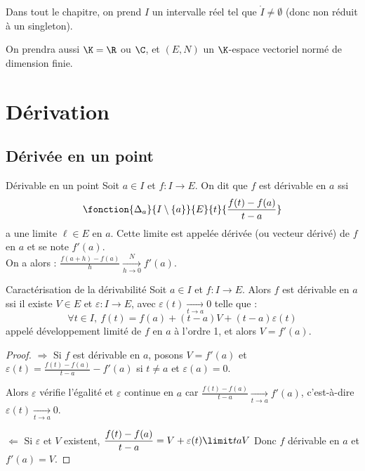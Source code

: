 Dans tout le chapitre, on prend $I$ un intervalle réel tel que $\mathring{I} \neq \emptyset$ (donc non réduit à un singleton).

On prendra aussi $\K = \R$ ou $\C$, et $(E,N)$ un $\K$-espace vectoriel normé
de dimension finie.

\section{Dérivation}
\subsection{Dérivée en un point}

\begin{definition}{Dérivable en un point}{}
    Soit $a \in I$ et $f: I \to E$. On dit que $f$ est dérivable en $a$ ssi 
    \[\fonction{\Delta_a}{I \setminus \{a\}}{E}{t}{\frac{f(t) - f(a)}{t-a}}\]
    a une limite $\ell \in E$ en $a$. Cette limite est appelée dérivée (ou vecteur dérivé)
    de $f$ en $a$ et se note $f'(a)$. \\

    On a alors : $\displaystyle \frac{f(a + h ) - f(a)}{h} \xrightarrow[h \to 0]{N} f'(a)$.
\end{definition}

\begin{proposition}{Caractérisation de la dérivabilité}{}
    Soit $a \in I$ et $f: I \to E$. Alors $f$ est dérivable en $a$ ssi il existe $V \in E$
    et $\varepsilon : I \to E$, avec $\varepsilon(t) \xrightarrow[t \to a]{} 0$ telle que :
    \[ \forall t \in I,~f(t) = f(a) + (t-a)V + (t-a)\varepsilon(t)\]
    appelé développement limité de $f$ en $a$ à l'ordre 1, et alors $V = f'(a)$.
\end{proposition}

\begin{proof}
    $\Rightarrow$ Si $f$ est dérivable en $a$, posons $V = f'(a)$ et $\varepsilon(t) = \frac{f(t) - f(a)}{t - a } - f'(a)$ si 
    $t \neq a$ et $\varepsilon(a) = 0$. 

    Alors $\varepsilon$ vérifie l'égalité et $\varepsilon$ continue en $a$ car 
    $\displaystyle \frac{f(t) - f(a)}{t-a} \xrightarrow[t \to a]{} f'(a)$, c'est-à-dire 
    $\varepsilon(t) \xrightarrow[t \to a]{} 0$.

    $\Leftarrow$ Si $\varepsilon$ et $V$ existent, $\displaystyle \frac{f(t) - f(a)}{t-a} = V + \varepsilon(t) \limit t a V$
    Donc $f$ dérivable en $a$ et $f'(a) = V$.
\end{proof}

